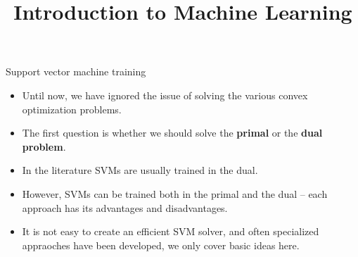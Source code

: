 




\newcommand{\titlefigure}{figure/svm_training_03.png}
\newcommand{\learninggoals}{
  \item Know that the SVM problem is not differentiable 
  \item Know how to optimize the SVM problem in the primal via subgradient descent
  \item Know how to optimize SVM in the dual formulation via pairwise coordinate ascent
}

\title{Introduction to Machine Learning}
\date{}




\sloppy 



\begin{vbframe}{Support vector machine training}

  \begin{itemize}
    \item Until now, we have ignored the issue of solving the
    various convex optimization problems.
    \item The first question is whether we should solve the \textbf{primal} or the \textbf{dual problem}.
    \item In the literature SVMs are usually trained in the dual.
    \item However, SVMs can be trained both in the primal and the dual -- each approach has its advantages and disadvantages.
    \item It is not easy to create an efficient SVM solver, and often specialized appraoches have been developed, 
      we only cover basic ideas here.
  \end{itemize}

\end{vbframe}

